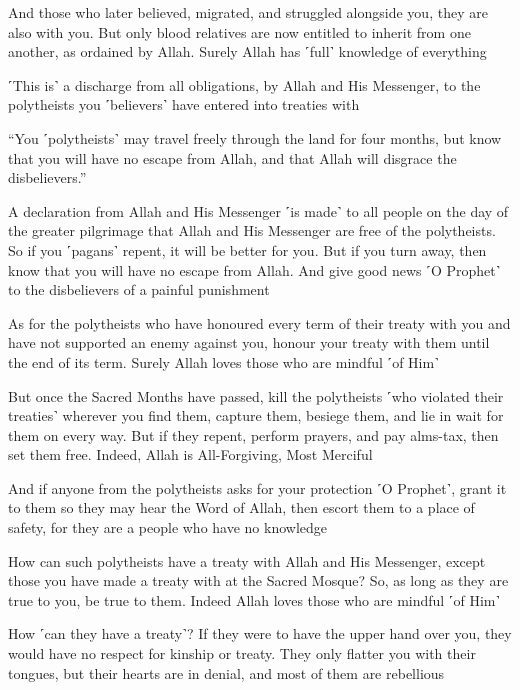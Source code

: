 And those who later believed, migrated, and struggled alongside you, they are also with you. But only blood relatives are now entitled to inherit from one another, as ordained by Allah. Surely Allah has ˹full˺ knowledge of everything

˹This is˺ a discharge from all obligations, by Allah and His Messenger, to the polytheists you ˹believers˺ have entered into treaties with

“You ˹polytheists˺ may travel freely through the land for four months, but know that you will have no escape from Allah, and that Allah will disgrace the disbelievers.”

A declaration from Allah and His Messenger ˹is made˺ to all people on the day of the greater pilgrimage that Allah and His Messenger are free of the polytheists. So if you ˹pagans˺ repent, it will be better for you. But if you turn away, then know that you will have no escape from Allah. And give good news ˹O Prophet˺ to the disbelievers of a painful punishment

As for the polytheists who have honoured every term of their treaty with you and have not supported an enemy against you, honour your treaty with them until the end of its term. Surely Allah loves those who are mindful ˹of Him˺

But once the Sacred Months have passed, kill the polytheists ˹who violated their treaties˺ wherever you find them, capture them, besiege them, and lie in wait for them on every way. But if they repent, perform prayers, and pay alms-tax, then set them free. Indeed, Allah is All-Forgiving, Most Merciful

And if anyone from the polytheists asks for your protection ˹O Prophet˺, grant it to them so they may hear the Word of Allah, then escort them to a place of safety, for they are a people who have no knowledge

How can such polytheists have a treaty with Allah and His Messenger, except those you have made a treaty with at the Sacred Mosque? So, as long as they are true to you, be true to them. Indeed Allah loves those who are mindful ˹of Him˺

How ˹can they have a treaty˺? If they were to have the upper hand over you, they would have no respect for kinship or treaty. They only flatter you with their tongues, but their hearts are in denial, and most of them are rebellious

